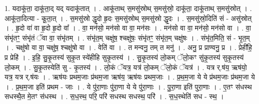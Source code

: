 \documentclass[17pt]{extarticle}
\begin{document}
1. यदाकू॑ता॒ दाकू॑ता॒द् यद् यदाकू॑तात् । . आकू॑ताथ् स॒मसु॑स्रोथ् स॒मसु॑स्रो॒ दाकू॑ता॒ दाकू॑ताथ् स॒मसु॑स्रोत् । . आकू॑ता॒दित्या - कू॒ता॒त् । . स॒मसु॑स्रो द्धृ॒दो हृ॒दः स॒मसु॑स्रोथ् स॒मसु॑स्रो द्धृ॒दः । . स॒मसु॑स्रो॒दिति॑ सं - असु॑स्रोत् । . हृ॒दो वा॑ वा हृ॒दो हृ॒दो वा᳚ । . वा॒ मन॑सो॒ मन॑सो वा वा॒ मन॑सः । . मन॑सो वा वा॒ मन॑सो॒ मन॑सो वा । . वा॒ संभृ॑तꣳ॒॒ संभृ॑तं ॅवा वा॒ संभृ॑तम् । . संभृ॑त॒म् चक्षु॑ष॒ श्चक्षु॑षः॒ संभृ॑तꣳ॒॒ संभृ॑त॒म् चक्षु॑षः । . संभृ॑त॒मिति॒ सं - भृ॒त॒म् । . चक्षु॑षो वा वा॒ चक्षु॑ष॒ श्चक्षु॑षो वा । . वेति॑ वा । . त मन्वनु॒ तम् त मनु॑ । . अनु॒ प्र प्राण्वनु॒ प्र । . प्रेही॑हि॒ प्र प्रेहि॑ । . इ॒हि॒ सु॒कृ॒तस्य॑ सुकृ॒त स्ये॑हीहि सुकृ॒तस्य॑ । . सु॒कृ॒तस्य॑ लो॒कम् ॅलो॒कꣳ सु॑कृ॒तस्य॑ सुकृ॒तस्य॑ लो॒कम् । . सु॒कृ॒तस्येति॑ सु - कृ॒तस्य॑ । . लो॒कं ॅयत्र॒ यत्र॑ लो॒कम् ॅलो॒कं ॅयत्र॑ । . यत्र र्.ष॑य॒ ऋष॑यो॒ यत्र॒ यत्र र्.ष॑यः । . ऋष॑यः प्रथम॒जाः प्र॑थम॒जा ऋष॑य॒ ऋष॑यः प्रथम॒जाः । . प्र॒थ॒म॒जा ये ये प्र॑थम॒जाः प्र॑थम॒जा ये । . प्र॒थ॒म॒जा इति॑ प्रथम - जाः । . ये पु॑रा॒णाः पु॑रा॒णा ये ये पु॑रा॒णाः । . पु॒रा॒णा इति॑ पुरा॒णाः । . ए॒तꣳ स॑धस्थ सधस्थै॒त मे॒तꣳ स॑धस्थ । . स॒ध॒स्थ॒ परि॒ परि॑ सधस्थ सधस्थ॒ परि॑ । . स॒ध॒स्थेति॑ सध - स्थ॒ । \newline
\end{document}
